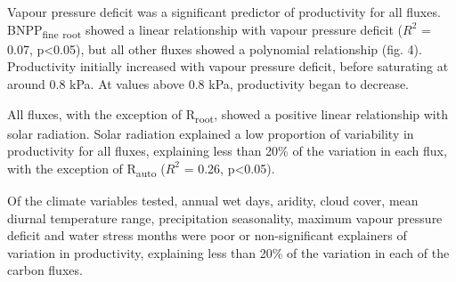 \documentclass[]{article}
\begin{document}
Vapour pressure deficit was a significant predictor of productivity for
all fluxes. BNPP\textsubscript{fine} \textsubscript{root} showed a
linear relationship with vapour pressure deficit (\(R^2\) = 0.07,
p\textless{}0.05), but all other fluxes showed a polynomial relationship
(fig. 4). Productivity initially increased with vapour pressure deficit,
before saturating at around 0.8 kPa. At values above 0.8 kPa,
productivity began to decrease.

All fluxes, with the exception of R\textsubscript{root}, showed a
positive linear relationship with solar radiation. Solar radiation
explained a low proportion of variability in productivity for all
fluxes, explaining less than 20\% of the variation in each flux, with
the exception of R\textsubscript{auto} (\(R^2\) = 0.26,
p\textless{}0.05).

Of the climate variables tested, annual wet days, aridity, cloud cover,
mean diurnal temperature range, precipitation seasonality, maximum
vapour pressure deficit and water stress months were poor or
non-significant explainers of variation in productivity, explaining less
than 20\% of the variation in each of the carbon fluxes.
\end{document}
